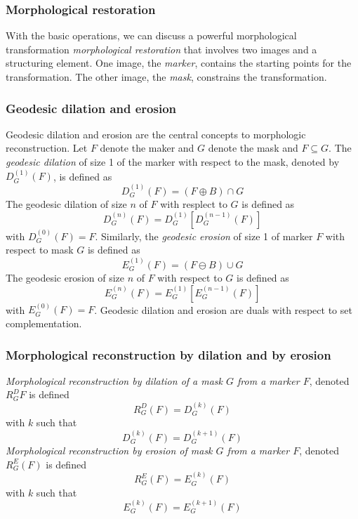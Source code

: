 \subsubsection{Morphological restoration}
With the basic operations, we can discuss a powerful morphological transformation \emph{morphological restoration} that involves two images and a structuring element. One image, the \emph{marker}, contains the starting points for the transformation. The other image, the \emph{mask}, constrains the transformation. \\
\subsubsection*{Geodesic dilation and erosion}
Geodesic dilation and erosion are the central concepts to morphologic reconstruction. Let $F$ denote the maker and $G$ denote the mask and $F \subseteq G$. The \emph{geodesic dilation} of size 1 of the marker with respect to the mask, denoted by $D_G^(1)(F)$, is defined as 
\begin{equation} D_G^{(1)}(F)=(F\oplus B) \cap G \end{equation}
The geodesic dilation of size $n$ of $F$ with resplect to $G$ is defined as 
\begin{equation} D_G^{(n)}(F)=D_G^{(1)} \left[ D_G^{(n-1)}(F) \right]\end{equation}
with $D_G^{(0)}(F)=F$. Similarly, the \emph{geodesic erosion} of size 1 of marker $F$ with respect to mask $G$ is defined as 
\begin{equation} E_G^{(1)}(F)=(F\ominus B) \cup G \end{equation}
The geodesic erosion of size $n$ of $F$ with respect to $G$ is defined as
\begin{equation} E_G^{(n)}(F)=E_G^{(1)} \left[ E_G^{(n-1)}(F) \right]\end{equation}
with $E_G^{(0)}(F)=F$. Geodesic dilation and erosion are duals with respect to set complementation. \\
\subsubsection*{Morphological reconstruction by dilation and by erosion}
\emph{Morphological reconstruction by dilation of a mask $G$ from a marker $F$}, denoted $R_G^D{F}$ is defined \begin{equation}R_G^D(F)=D_G^{(k)}(F)\end{equation} with $k$ such that \begin{equation}D_G^{(k)}(F)=D_G^{(k+1)}(F)\end{equation} \emph{Morphological reconstruction by erosion of mask $G$ from a marker $F$}, denoted $R_G^E(F)$ is defined \begin{equation}R_G^E(F)=E_G^{(k)}(F)\end{equation} with $k$ such that \begin{equation}E_G^{(k)}(F)=E_G^{(k+1)}(F)\end{equation}


